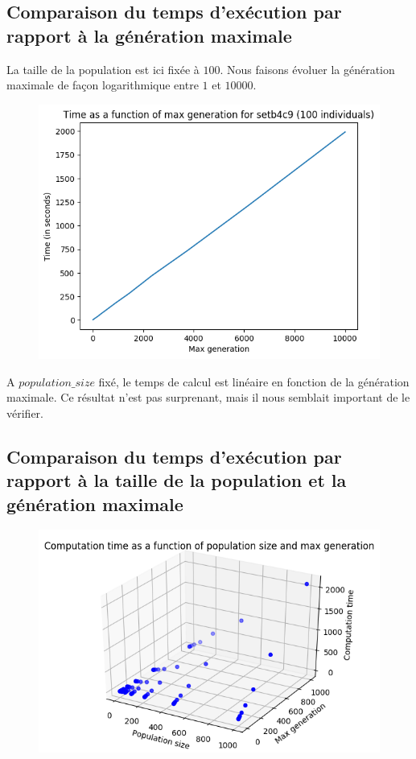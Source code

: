 \subsection{Comparaison du temps d'exécution par rapport à la génération maximale}

La taille de la population est ici fixée à $100$. Nous faisons évoluer la génération maximale de façon logarithmique entre $1$ et $10000$.

\begin{figure}[!h]
    \centering
    \includegraphics[scale=0.9]{report/Pictures/setb4c9_benchmarks_generation.png}
\end{figure}

A $population\_size$ fixé, le temps de calcul est linéaire en fonction de la génération maximale. Ce résultat n'est pas surprenant, mais il nous semblait important de le vérifier.

\newpage

\subsection{Comparaison du temps d'exécution par rapport à la taille de la population et la génération maximale}

\begin{figure}[!h]
    \centering
    \includegraphics[scale=0.9]{report/Pictures/setb4c9_benchmarks_generation_with_computation_time.png}
\end{figure}

